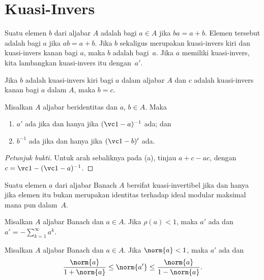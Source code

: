 \section{Kuasi-Invers}
\begin{defn} Suatu elemen $b$ dari aljabar $A$ adalah  bagi $a \in A$ jika
$ba = a + b$. Elemen tersebut adalah  bagi $a$ jika $ab = a + b$. Jika $b$
sekaligus merupakan kuasi-invers kiri dan kuasi-invers kanan bagi $a$, maka $b$ adalah
 bagi~$a$. Jika $a$ memiliki kuasi-invers, kita lambangkan kuasi-invers itu dengan~$a'$.
\end{defn}

\begin{prop} Jika $b$ adalah kuasi-invers kiri bagi $a$ dalam aljabar $A$ dan $c$ adalah
kuasi-invers kanan bagi $a$ dalam $A$, maka $b = c$.
\end{prop}

\begin{prop} Misalkan $A$ aljabar beridentitas dan $a$, $b \in A$. Maka
 \begin{enumerate}
  \item[(a)] $a'$ ada jika dan hanya jika $(\vc 1 - a)^{-1}$ ada; dan
  \item[(b)] $b^{-1}$ ada jika dan hanya jika $(\vc 1 - b)'$ ada.
 \end{enumerate}
\end{prop}

\begin{proof}[\emph{Petunjuk bukti}] Untuk arah sebaliknya pada (a), tinjau
$a + c - ac$, dengan $c = \vc 1 - (\vc 1 - a)^{-1}$. \ns
\end{proof}

\begin{prop} Suatu elemen $a$ dari aljabar Banach $A$ bersifat kuasi-invertibel jika dan hanya jika
elemen itu bukan merupakan identitas terhadap ideal modular maksimal mana pun dalam~$A$.
\end{prop}

\begin{prop} Misalkan $A$ aljabar Banach dan $a \in A$. Jika $\rho(a) < 1$, maka $a'$ ada
dan $a' = -\sum_{k=1}^\infty a^k$.
\end{prop}

\begin{prop} Misalkan $A$ aljabar Banach dan $a \in A$. Jika $\norm{a} < 1$, maka $a'$ ada
dan
   \[ \frac{\norm{a}}{1 + \norm{a}} \le \norm{a'} \le \frac{\norm{a}}{1 - \norm{a}}. \]
\end{prop}

